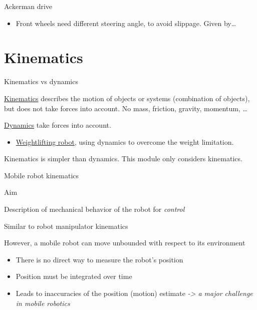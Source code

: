 \documentclass[compress]{beamer}
\begin{document}
\begin{frame}{Ackerman drive}

\begin{itemize}
    \item Front wheels need different steering angle, to avoid slippage. Given
  by\ldots{}
\end{itemize}

\end{frame}

\section{Kinematics}

\begin{frame}{Kinematics vs dynamics}

\href{http://en.wikipedia.org/wiki/Kinematics}{Kinematics} describes the
motion of objects or systems (combination of objects), but does not take
forces into account. No mass, friction, gravity, momentum, \ldots{}

\href{http://en.wikipedia.org/wiki/Analytical_dynamics}{Dynamics} take
forces into account.

\begin{itemize}
    \item \href{http://www.youtube.com/watch?v=kEed8DVO21I}{Weightlifting
  robot}, using dynamics to overcome the weight limitation.
\end{itemize}

Kinematics is simpler than dynamics. This module only considers
kinematics.

\end{frame}

\begin{frame}{Mobile robot kinematics}

Aim

Description of mechanical behavior of the robot for \emph{control}

Similar to robot manipulator kinematics

However, a mobile robot can move unbounded with respect to its
environment

\begin{itemize}
    \item There is no direct way to measure the robot's position
    \item Position must be integrated over time
    \item Leads to inaccuracies of the position (motion) estimate
  \emph{-\textgreater{} a major challenge in mobile robotics}
\end{itemize}

\end{frame}
\end{document}
